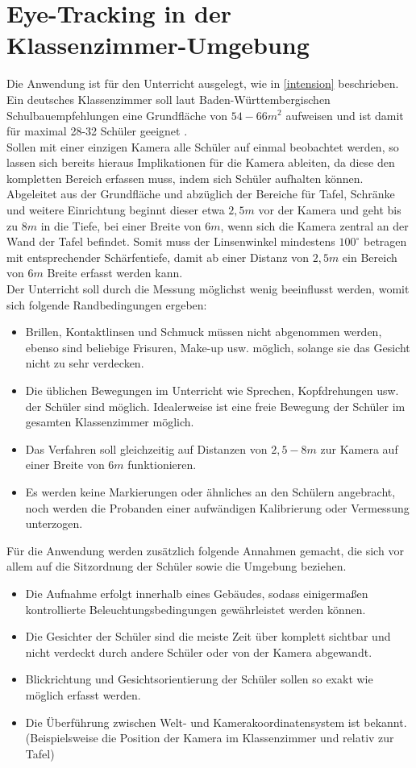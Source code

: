 \section{Eye-Tracking in der Klassenzimmer-Umgebung}
Die Anwendung ist für den Unterricht ausgelegt, wie in \autoref{intension} beschrieben. Ein deutsches Klassenzimmer soll laut Baden-Württembergischen Schulbauempfehlungen eine Grundfläche von $54-66m^2$ aufweisen und ist damit für maximal 28-32 Schüler geeignet \cite{bauordung}.\\
Sollen mit einer einzigen Kamera alle Schüler auf einmal beobachtet werden, so lassen sich bereits hieraus Implikationen für die Kamera ableiten, da diese den kompletten Bereich erfassen muss, indem sich Schüler aufhalten können.\\
Abgeleitet aus der Grundfläche und abzüglich der Bereiche für Tafel, Schränke und weitere Einrichtung beginnt dieser etwa $2,5m$ vor der Kamera und geht bis zu $8m$ in die Tiefe, bei einer Breite von $6m$, wenn sich die Kamera zentral an der Wand der Tafel befindet.
\newpage
Somit muss der Linsenwinkel mindestens $100^\circ$ betragen mit entsprechender Schärfentiefe, damit ab einer Distanz von $2,5m$ ein Bereich von $6m$ Breite erfasst werden kann.\\
Der Unterricht soll durch die Messung möglichst wenig beeinflusst werden, womit sich folgende Randbedingungen ergeben:
\begin{itemize}
\item Brillen, Kontaktlinsen und Schmuck müssen nicht abgenommen werden, ebenso sind beliebige Frisuren, Make-up usw. möglich, solange sie das Gesicht nicht zu sehr verdecken.
\item Die üblichen Bewegungen im Unterricht wie Sprechen, Kopfdrehungen usw. der Schüler sind möglich. Idealerweise ist eine freie Bewegung der Schüler im gesamten Klassenzimmer möglich.
\item Das Verfahren soll gleichzeitig auf Distanzen von $2,5 - 8m$ zur Kamera auf einer Breite von $6m$ funktionieren.
\item Es werden keine Markierungen oder ähnliches an den Schülern angebracht, noch werden die Probanden einer aufwändigen Kalibrierung oder Vermessung unterzogen.
\end{itemize}
Für die Anwendung werden zusätzlich folgende Annahmen gemacht, die sich vor allem auf die Sitzordnung der Schüler sowie die Umgebung beziehen.
\begin{itemize}
\item Die Aufnahme erfolgt innerhalb eines Gebäudes, sodass einigermaßen kontrollierte Beleuchtungsbedingungen gewährleistet werden können.
\item Die Gesichter der Schüler sind die meiste Zeit über komplett sichtbar und nicht verdeckt durch andere Schüler oder von der Kamera abgewandt.
\item Blickrichtung und Gesichtsorientierung der Schüler sollen so exakt wie möglich erfasst werden.
\item Die Überführung zwischen Welt- und Kamerakoordinatensystem ist bekannt.\\
(Beispielsweise die Position der Kamera im Klassenzimmer und relativ zur Tafel)
\end{itemize}